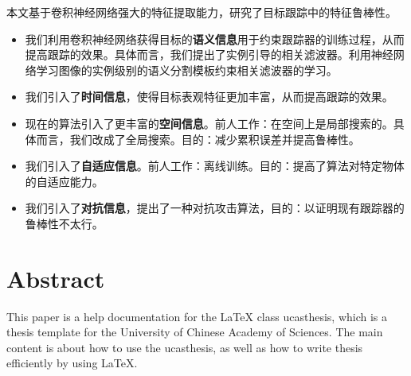 本文基于卷积神经网络强大的特征提取能力，研究了目标跟踪中的特征鲁棒性。
\begin{itemize}
\item{我们利用卷积神经网络获得目标的\textbf{语义信息}用于约束跟踪器的训练过程，从而提高跟踪的效果。具体而言，我们提出了实例引导的相关滤波器。利用神经网络学习图像的实例级别的语义分割模板约束相关滤波器的学习。}
\item{我们引入了\textbf{时间信息}，使得目标表观特征更加丰富，从而提高跟踪的效果。}
\item{现在的算法引入了更丰富的\textbf{空间信息}。前人工作：在空间上是局部搜索的。具体而言，我们改成了全局搜索。目的：减少累积误差并提高鲁棒性。}
\item{我们引入了\textbf{自适应信息}。前人工作：离线训练。目的：提高了算法对特定物体的自适应能力。}
\item{我们引入了\textbf{对抗信息}，提出了一种对抗攻击算法，目的：以证明现有跟踪器的鲁棒性不太行。}
\end{itemize}

\intobmk\chapter*{Abstract}%

This paper is a help documentation for the \LaTeX{} class ucasthesis, which is  a thesis template for the University of Chinese Academy of Sciences. The main content is about how to use the ucasthesis, as well as how to write thesis efficiently by using \LaTeX{}.

